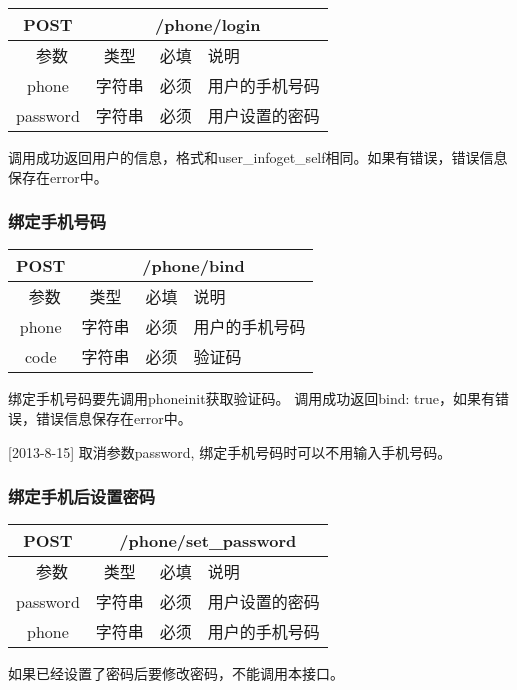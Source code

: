 \begin{table}[H]
   \begin{center}
\begin{tabular}{|c|c|c|p{12cm}|}
\hline
POST & \multicolumn{3}{|c|}{/phone/login} \\
\hline\hline
 \  参数  & 类型 & 必填 &  说明  \\
\hline
 phone  & 字符串 & 必须 &  用户的手机号码\\
\hline
 password  & 字符串 & 必须 &  用户设置的密码\\
\hline
\end{tabular}
   \end{center}
\end{table}

调用成功返回用户的信息，格式和user\_info\/get\_self相同。如果有错误，错误信息保存在error中。



\subsubsection{绑定手机号码}
\label{hash_algorithm}

\begin{table}[H]
   \begin{center}
\begin{tabular}{|c|c|c|p{12cm}|}
\hline
POST & \multicolumn{3}{|c|}{/phone/bind} \\
\hline\hline
 \  参数  & 类型 & 必填 &  说明  \\
\hline
 phone  & 字符串 & 必须 &  用户的手机号码\\
\hline
 code  & 字符串 & 必须 &  验证码\\
\hline
\end{tabular}
   \end{center}
\end{table}

绑定手机号码要先调用phone\/init获取验证码。
调用成功返回{bind: true}，如果有错误，错误信息保存在error中。

[2013-8-15] 取消参数password, 绑定手机号码时可以不用输入手机号码。


\subsubsection{绑定手机后设置密码}
\label{hash_algorithm}

\begin{table}[H]
   \begin{center}
\begin{tabular}{|c|c|c|p{12cm}|}
\hline
POST & \multicolumn{3}{|c|}{/phone/set\_password} \\
\hline\hline
 \  参数  & 类型 & 必填 &  说明  \\
\hline
 password  & 字符串 & 必须 &  用户设置的密码\\
 \hline
 phone  & 字符串 & 必须 &  用户的手机号码\\
\hline
\end{tabular}
   \end{center}
\end{table}
如果已经设置了密码后要修改密码，不能调用本接口。


